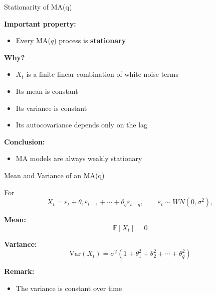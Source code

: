 \documentclass[aspectratio=169]{beamer}
\begin{document}
\begin{frame}{Stationarity of MA(q)}

\textbf{Important property:}
\begin{itemize}
    \item Every MA($q$) process is \textbf{stationary}
\end{itemize}

\vspace{0.4cm}

\textbf{Why?}
\begin{itemize}
    \item $X_t$ is a finite linear combination of white noise terms
    \item Its mean is constant
    \item Its variance is constant
    \item Its autocovariance depends only on the lag
\end{itemize}

\vspace{0.4cm}

\textbf{Conclusion:}
\begin{itemize}
    \item MA models are always weakly stationary
\end{itemize}

\end{frame}
\begin{frame}{Mean and Variance of an MA(q)}

For
\[
X_t = \varepsilon_t + \theta_1\varepsilon_{t-1} + \cdots + \theta_q\varepsilon_{t-q},
\qquad \varepsilon_t \sim WN(0,\sigma^2),
\]

\vspace{0.3cm}

\textbf{Mean:}
\[
\mathbb{E}[X_t]=0
\]

\vspace{0.3cm}

\textbf{Variance:}
\[
\mathrm{Var}(X_t)=\sigma^2\left(1+\theta_1^2+\theta_2^2+\cdots+\theta_q^2\right)
\]

\vspace{0.4cm}

\textbf{Remark:}
\begin{itemize}
    \item The variance is constant over time
\end{itemize}

\end{frame}
\end{document}
